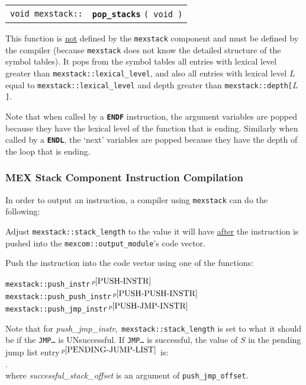 \documentclass[12pt]{article}
\makeatletter
\newcommand{\TT}[1]{{\tt \bfseries #1}}
\newcommand{\ttindex}[1]{\index{#1@{\tt #1}}}
\newcommand{\pagnote}[1]{$\,^{p\pageref{#1}}$}
\newcommand{\EOL}{\penalty \exhyphenpenalty}
\newenvironment{indpar}[1][0.3in]%
	{\begin{list}{}%
		     {\setlength{\itemsep}{0in}%
		      \setlength{\topsep}{0in}%
		      \setlength{\parsep}{1ex}%
		      \setlength{\labelwidth}{#1}%
		      \setlength{\leftmargin}{#1}%
		      \addtolength{\leftmargin}{\labelsep}}%
	 \item}%
	{\end{list}}
\newcommand{\MEXSTACKKEY}[1]%
	   {\TT{#1}\ttindex{mexstack::#1}\ttindex{#1}}
\makeatother
\begin{document}
\begin{tabular}{@{}r@{~~~}l}
\verb|void mexstack::| & \MEXSTACKKEY{pop\_stacks} {\tt ( void )}
\end{tabular}
\begin{indpar}
This function is \underline{not} defined by the {\tt mexstack} component
and must be defined by the compiler (because {\tt mexstack} does not
know the detailed structure of the symbol tables).
It pops from the symbol
tables all entries with lexical level greater than
{\tt mexstack::\EOL lexical\_\EOL level}, and 
also all entries with lexical level $L$ equal to
{\tt mexstack::\EOL lexical\_\EOL level} and 
depth greater than {\tt mexstack::\EOL depth[$L$]}.

Note that when called by a \TT{ENDF} instruction, the argument
variables are popped because they have the lexical level of
the function that is ending.  Similarly when called by a \TT{ENDL},
the `next' variables are popped because they have the depth of the
loop that is ending.
\end{indpar}

\subsubsection{MEX Stack Component Instruction Compilation}
\label{MEX-STACK-COMPONENT-INSTRUCTION-COMPILATION}

In order to output an instruction, a compiler using {\tt mexstack} can
do the following:

\begin{enumerate}
\item Adjust {\tt mexstack::stack\_length} to the value it will have
\underline{after} the instruction is pushed into the
{\tt mexcom::output\_module}'s code vector.

\item Push the instruction into the code vector using one of the
functions:
\begin{indpar}[1in]
{\tt mexstack::push\_instr}\pagnote{PUSH-INSTR} \\
{\tt mexstack::push\_push\_instr}\pagnote{PUSH-PUSH-INSTR} \\
{\tt mexstack::push\_jmp\_instr}\pagnote{PUSH-JMP-INSTR}
\end{indpar}

\item Note that for {\em push\_jmp\_instr}, \,{\tt mexstack::stack\_length}
is set to what it should be if the {\tt JMP\ldots} is
UNsuccessful.  If {\tt JMP\ldots} is successful, the value of $S$
in the pending jump list entry\pagnote{PENDING-JUMP-LIST} is: \\
\hspace*{1in}{\tt mexstack::stack\_length + successful\_stack\_offset}. \\
where {\em successful\_stack\_offset} is an argument of
{\tt push\_jmp\_offset}.

\end{enumerate}
\end{document}

